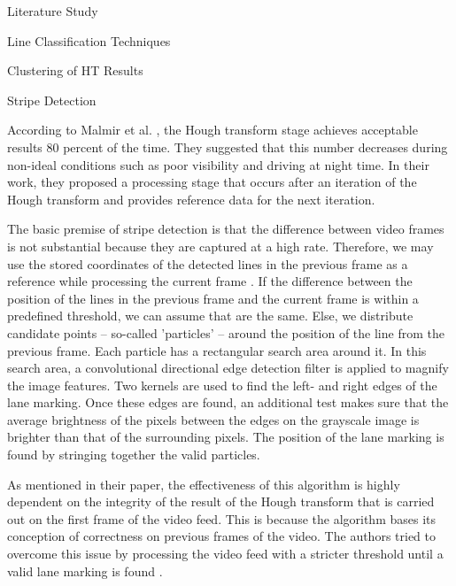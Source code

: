 \documentclass{matthijs}
\begin{document}
\begin{hoofdstuk}{Literature Study}
\begin{paragraaf}{Line Classification Techniques}
\begin{subparagraaf}{Clustering of HT Results}
			\end{subparagraaf}

			\begin{subparagraaf}{Stripe Detection}

				According to Malmir et al. \cite{malmir2019design}, the Hough transform stage achieves acceptable results 80 percent of the time.
				They suggested that this number decreases during non-ideal conditions such as poor visibility and driving at night time.
				In their work, they proposed a processing stage that occurs after an iteration of the Hough transform and provides reference data for the next iteration.

				\bigskip

				The basic premise of stripe detection is that the difference between video frames is not substantial because they are captured at a high rate.
				Therefore, we may use the stored coordinates of the detected lines in the previous frame as a reference while processing the current frame \cite{malmir2019design}.
				If the difference between the position of the lines in the previous frame and the current frame is within a predefined threshold, we can assume that are the same.
				Else, we distribute candidate points -- so-called 'particles' -- around the position of the line from the previous frame.
				Each particle has a rectangular search area around it.
				In this search area, a convolutional directional edge detection filter is applied to magnify the image features.
				Two kernels are used to find the left- and right edges of the lane marking.
				Once these edges are found, an additional test makes sure that the average brightness of the pixels between the edges on the grayscale image is brighter than that of the surrounding pixels.
				The position of the lane marking is found by stringing together the valid particles.

				\bigskip

				As mentioned in their paper, the effectiveness of this algorithm is highly dependent on the integrity of the result of the Hough transform that is carried out on the first frame of the video feed.
				This is because the algorithm bases its conception of correctness on previous frames of the video.
				The authors tried to overcome this issue by processing the video feed with a stricter threshold until a valid lane marking is found \cite{malmir2019design}.

			\end{subparagraaf}

		\end{paragraaf}

	\end{hoofdstuk}
	
\end{document}
